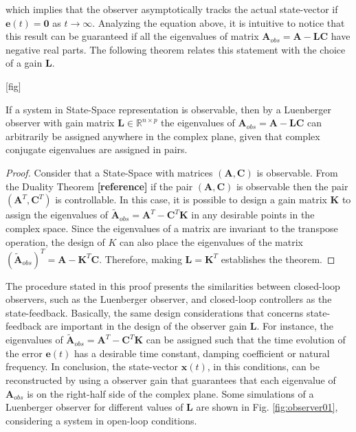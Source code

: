 \documentclass[a4paper,11pt]{book}
\numberwithin{figure}{chapter}
\numberwithin{equation}{chapter}
\numberwithin{table}{chapter}
\newtheorem{theorem}{Theorem}[chapter]
\theoremstyle{definition}
\newcounter{boxed-theorem}
\newenvironment{boxed-theorem}[1]
{\begin{shaded} \begin{theorem}{#1}}
{\end{theorem} \end{shaded}}
\newcounter{boxed-definition}
\begin{document}
\noindent which implies that the observer asymptotically tracks the actual state-vector if $\bm{e}(t) = \bm{0}$ as $t \to \infty$. Analyzing the equation above, it is intuitive to notice that this result can be guaranteed if all the eigenvalues of matrix $\bm{A}_{obs} = \bm{A} - \bm{L} \bm{C}$ have negative real parts. The following theorem relates this statement with the choice of a gain $\bm{L}$.

[fig]

\begin{boxed-theorem}
	If a system in State-Space representation is observable, then by a Luenberger observer with gain matrix $\bm{L} \in \mathbb{R}^{n \times p}$ the eigenvalues of $\bm{A}_{obs} = \bm{A} - \bm{L} \bm{C}$ can arbitrarily be assigned anywhere in the complex plane, given that complex conjugate eigenvalues are assigned in pairs.
\end{boxed-theorem} 

\begin{proof}
	Consider that a State-Space with matrices $(\bm{A}, \bm{C})$ is observable. From the Duality Theorem \textbf{[reference]} if the pair $(\bm{A}, \bm{C})$ is observable then the pair $(\bm{A}^T, \bm{C}^T)$ is controllable. In this case, it is possible to design 	a gain matrix $\bm{K}$ to assign the eigenvalues of $\tilde{\bm{A}}_{obs} = \bm{A}^T - \bm{C}^T \bm{K}$ in any desirable points in the complex space. Since the eigenvalues of a matrix are invariant to the transpose operation, the design of $K$ can also place the eigenvalues of the matrix $(\tilde{\bm{A}}_{obs})^T = \bm{A} - \bm{K}^T \bm{C}$. Therefore, making $\bm{L} = \bm{K}^T$ establishes the theorem.
\end{proof}

The procedure stated in this proof presents the similarities between closed-loop observers, such as the Luenberger observer, and closed-loop controllers as the state-feedback. Basically, the same design considerations that concerns state-feedback are important in the design of the observer gain $\bm{L}$. For instance, the eigenvalues of $\tilde{\bm{A}}_{obs} = \bm{A}^T - \bm{C}^T \bm{K}$ can be assigned such that the time evolution of the error $\bm{e}(t)$ has a desirable time constant, damping coefficient or natural frequency. In conclusion, the state-vector $\bm{x}(t)$, in this conditions, can be reconstructed by using a observer gain that guarantees that each eigenvalue of $\bm{A}_{obs}$ is on the right-half side of the complex plane. Some simulations of a Luenberger observer for different values of $\bm{L}$ are shown in Fig. \ref{fig:observer01}, considering a system in open-loop conditions.
\end{document}
